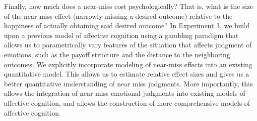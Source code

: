\documentclass[10pt,letterpaper]{article}
\begin{document}
Finally, how much does a near-miss cost psychologically? That is, what is the size of the near miss effect (narrowly missing a desired outcome) relative to the happiness of actually obtaining said desired outcome? In Experiment 3, we build upon a previous model of affective cognition \cite{OngAffCog} using a gambling paradigm that allows us to parametrically vary features of the situation that affects judgment of emotions, such as the payoff structure and the distance to the neighboring outcomes. We explicitly incorporate modeling of near-miss effects into an existing quantitative model. This allows us to estimate relative effect sizes and gives us a better quantitative understanding of near miss judgments. More importantly, this allows the integration of near miss emotional judgments into existing models of affective cognition, and allows the construction of more comprehensive models of affective cognition.  








\end{document}
